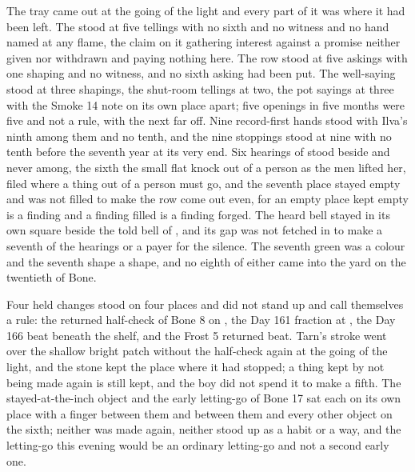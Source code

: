 \scenebreak

The tray came out at the going of the light and every part of it was where it had been left. The  stood at five tellings with no sixth and no witness and no hand named at any flame, the claim on it gathering interest against a promise neither given nor withdrawn and paying nothing here. The row stood at five askings with one shaping and no witness, and no sixth asking had been put. The well-saying stood at three shapings, the shut-room tellings at two, the pot sayings at three with the Smoke 14 note on its own place apart; five openings in five months were five and not a rule, with the next far off. Nine record-first hands stood with Ilva's ninth among them and no tenth, and the nine stoppings stood at nine with no tenth before the seventh year at its very end. Six hearings of  stood beside and never among, the sixth the small flat knock out of a person as the men lifted her, filed where a thing out of a person must go, and the seventh place stayed empty and was not filled to make the row come out even, for an empty place kept empty is a finding and a finding filled is a finding forged. The heard bell stayed in its own square beside the told bell of , and its gap was not fetched in to make a seventh of the hearings or a payer for the silence. The seventh green was a colour and the seventh shape a shape, and no eighth of either came into the yard on the twentieth of Bone.

Four held changes stood on four places and did not stand up and call themselves a rule: the returned half-check of Bone 8 on , the Day 161 fraction at , the Day 166 beat beneath the shelf, and the Frost 5 returned beat. Tarn's stroke went over the shallow bright patch without the half-check again at the going of the light, and the stone kept the place where it had stopped; a thing kept by not being made again is still kept, and the boy did not spend it to make a fifth. The stayed-at-the-inch object and the early letting-go of Bone 17 sat each on its own place with a finger between them and between them and every other object on the sixth; neither was made again, neither stood up as a habit or a way, and the letting-go this evening would be an ordinary letting-go and not a second early one.

